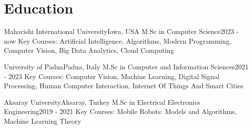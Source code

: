 \section{Education}
\vspace{3pt}
\resumeSubHeadingListStart

\resumeEducationHeading
{Maharishi International University}{Iowa, USA}
{M.Sc in Computer Science}{2023 - now}
{Key Courses: Artificial Intelligence, Algorithms, Modern Programming, Computer Vision, Big Data Analytics, Cloud Computing}

\resumeEducationHeading
{University of Padua}{Padua, Italy}
{M.Sc in Computer and Information Sciences}{2021 - 2023}
{Key Courses: Computer Vision, Machine Learning, Digital Signal Processing, Human Computer Interaction, Internet Of Things And Smart Cities}

\resumeEducationHeading
{Aksaray University}{Aksaray, Turkey}
{M.Sc in Electrical Electronics Engineering}{2019 - 2021}
{Key Courses: Mobile Robots: Models and Algorithms, Machine Learning Theory}

\resumeSubHeadingListEnd